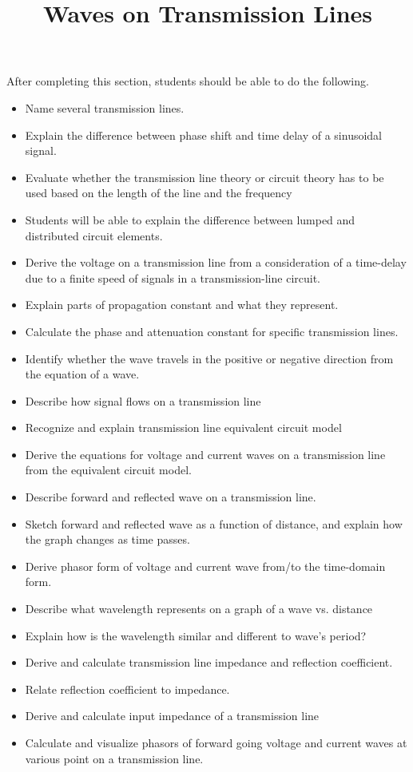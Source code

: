 \documentclass{ximera}
\title{Waves on Transmission Lines}
\begin{document}
\begin{abstract}
\end{abstract}

\maketitle

\begin{sectionOutcomes}

After completing this section, students should be able to do the following.

\begin{itemize}
\item Name several transmission lines.
\item Explain the difference between phase shift and time delay of a sinusoidal signal.
\item Evaluate whether the transmission line theory or circuit theory has to be used based on the length of the line and the frequency
\item Students will be able to explain the difference between lumped and distributed circuit elements.
\item Derive the voltage on a transmission line from a consideration of a time-delay due to a finite speed of signals in a transmission-line circuit.
\item Explain parts of propagation constant and what they represent.
\item Calculate the phase and attenuation constant for specific transmission lines.
\item Identify whether the wave travels in the positive or negative direction from the equation of a wave.
\item Describe how signal flows on a transmission line
\item Recognize and explain transmission line equivalent circuit model
\item Derive the equations for voltage and current waves on a transmission line from the equivalent circuit model.
\item Describe forward and reflected wave on a transmission line.
\item Sketch forward and reflected wave as a function of distance, and explain how the graph changes as time passes.
\item Derive phasor form of voltage and current wave from/to the time-domain form.
\item Describe what wavelength represents on a graph of a wave vs. distance
\item Explain how is the wavelength similar and different to wave’s period?
\item Derive and calculate transmission line impedance and reflection coefficient.
\item Relate reflection coefficient to impedance.
\item Derive and calculate input impedance of a transmission line
\item Calculate and visualize phasors of forward going voltage and current waves at various point on a transmission line.
\end{itemize}

\end{sectionOutcomes}
\end{document}
